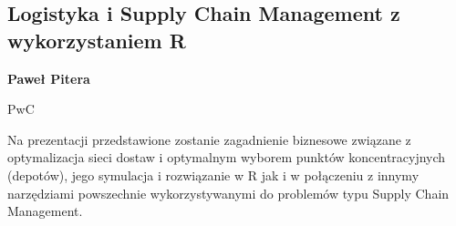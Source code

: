 \documentclass[\main/boa.tex]{subfiles}
\begin{document}
\subsection{Logistyka i Supply Chain Management z wykorzystaniem R}

\begin{minipage}{0.915\textwidth}
	\centering
  {\bf {} Paweł Pitera}
\end{minipage}

\vskip 0.3cm

\begin{affiliations}
\begin{minipage}{0.915\textwidth}
\centering
PwC \\[-2pt]
\end{minipage}
\end{affiliations}

\vskip 0.8cm

  Na prezentacji przedstawione zostanie zagadnienie biznesowe związane z optymalizacja sieci dostaw i optymalnym wyborem punktów koncentracyjnych (depotów), jego symulacja i rozwiązanie w R jak i w połączeniu z innymy narzędziami powszechnie wykorzystywanymi do problemów typu Supply Chain Management. 
\end{document}
